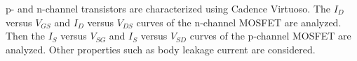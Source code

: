 p- and n-channel transistors are characterized using Cadence Virtuoso. The $I_{D}$ versus $V_{GS}$ and $I_{D}$ versus $V_{DS}$ curves of the n-channel MOSFET are analyzed. Then the $I_{S}$ versus $V_{SG}$ and $I_{S}$ versus $V_{SD}$ curves of the p-channel MOSFET are analyzed. Other properties such as body leakage current are considered.
